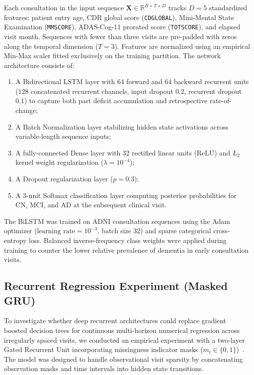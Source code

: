 Each consultation in the input sequence $\mathbf{X} \in \mathbb{R}^{B \times T \times D}$ tracks $D = 5$ standardized features: patient entry age, CDR global score (\texttt{CDGLOBAL}), Mini-Mental State Examination (\texttt{MMSCORE}), ADAS-Cog-11 prorated score (\texttt{TOTSCORE}), and elapsed visit month. Sequences with fewer than three visits are pre-padded with zeros along the temporal dimension ($T=3$). Features are normalized using an empirical Min-Max scaler fitted exclusively on the training partition. The network architecture consists of:
\begin{enumerate}
    \item A Bidirectional LSTM layer with 64 forward and 64 backward recurrent units ($128$ concatenated recurrent channels, input dropout $0.2$, recurrent dropout $0.1$) to capture both past deficit accumulation and retrospective rate-of-change;
    \item A Batch Normalization layer stabilizing hidden state activations across variable-length sequence inputs;
    \item A fully-connected Dense layer with 32 rectified linear units (ReLU) and $L_2$ kernel weight regularization ($\lambda = 10^{-4}$);
    \item A Dropout regularization layer ($p = 0.3$);
    \item A 3-unit Softmax classification layer computing posterior probabilities for CN, MCI, and AD at the subsequent clinical visit.
\end{enumerate}
The BiLSTM was trained on ADNI consultation sequences using the Adam optimizer ($\text{learning rate} = 10^{-3}$, batch size 32) and sparse categorical cross-entropy loss. Balanced inverse-frequency class weights were applied during training to counter the lower relative prevalence of dementia in early consultation visits.

\subsection{Recurrent Regression Experiment (Masked GRU)}
To investigate whether deep recurrent architectures could replace gradient boosted decision trees for continuous multi-horizon numerical regression across irregularly spaced visits, we conducted an empirical experiment with a two-layer Gated Recurrent Unit incorporating missingness indicator masks ($m_t \in \{0, 1\}$)~\cite{che2018grud}. The model was designed to handle observational visit sparsity by concatenating observation masks and time intervals into hidden state transitions.

